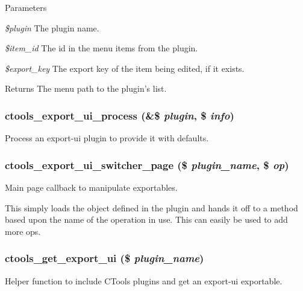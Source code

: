 \begin{DoxyParams}{Parameters}
\item[{\em \$plugin}]The plugin name. \item[{\em \$item\_\-id}]The id in the menu items from the plugin. \item[{\em \$export\_\-key}]The export key of the item being edited, if it exists. \end{DoxyParams}
\begin{DoxyReturn}{Returns}
The menu path to the plugin's list. 
\end{DoxyReturn}
\hypertarget{export-ui_8inc_a8d8ff38dc4b5e320df5f56ddb7869c7e}{
\subsubsection[{ctools\_\-export\_\-ui\_\-process}]{\setlength{\rightskip}{0pt plus 5cm}ctools\_\-export\_\-ui\_\-process (\&\$ {\em plugin}, \/  \$ {\em info})}}
\label{export-ui_8inc_a8d8ff38dc4b5e320df5f56ddb7869c7e}
Process an export-\/ui plugin to provide it with defaults. \hypertarget{export-ui_8inc_af3315a21d2e02ce4637e2a2c71710c9b}{
\subsubsection[{ctools\_\-export\_\-ui\_\-switcher\_\-page}]{\setlength{\rightskip}{0pt plus 5cm}ctools\_\-export\_\-ui\_\-switcher\_\-page (\$ {\em plugin\_\-name}, \/  \$ {\em op})}}
\label{export-ui_8inc_af3315a21d2e02ce4637e2a2c71710c9b}
Main page callback to manipulate exportables.

This simply loads the object defined in the plugin and hands it off to a method based upon the name of the operation in use. This can easily be used to add more ops. \hypertarget{export-ui_8inc_a63e2d31a77d34f020fc79e74e0c3bdcd}{
\subsubsection[{ctools\_\-get\_\-export\_\-ui}]{\setlength{\rightskip}{0pt plus 5cm}ctools\_\-get\_\-export\_\-ui (\$ {\em plugin\_\-name})}}
\label{export-ui_8inc_a63e2d31a77d34f020fc79e74e0c3bdcd}
Helper function to include CTools plugins and get an export-\/ui exportable.


